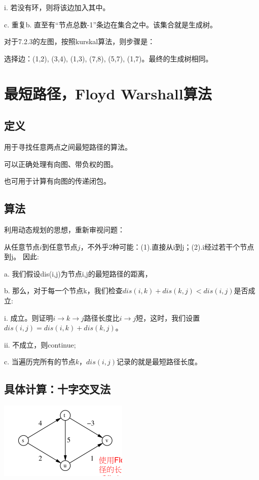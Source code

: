 \documentclass[a4paper]{article}    %
\begin{document}
\indent\indent i. 若没有环，则将该边加入其中。

c. 重复b. 直至有“节点总数-1”条边在集合之中。该集合就是生成树。

对于7.2.3的左图，按照kurskal算法，则步骤是：

选择边：(1,2), (3,4), (1,3), (7,8), (5,7), (1,7)。最终的生成树相同。

\section{最短路径，Floyd Warshall算法}

\subsection{定义}

用于寻找任意两点之间最短路径的算法。

可以正确处理有向图、带负权的图。

也可用于计算有向图的传递闭包。

\subsection{算法}

利用动态规划的思想，重新审视问题：

从任意节点$i$到任意节点$j$，不外乎2种可能：(1).直接从i到j；(2).i经过若干个节点到j。
因此:

a. 我们假设dis(i,j)为节点i,j的最短路径的距离，

b. 那么，对于每一个节点k，我们检查$dis(i,k)+dis(k,j) < dis(i,j)$是否成立:

\indent\indent i. 成立。则证明$i\rightarrow k \rightarrow j$路径长度比$i\rightarrow j$短，这时，我们设置$dis(i,j) = dis(i,k) + dis(k,j)$。

\indent\indent ii. 不成立，则continue;

c. 当遍历完所有的节点$k$，$dis(i,j)$记录的就是最短路径长度。

\subsection{具体计算：十字交叉法}

\begin{center}
    \includegraphics[scale=0.6]{25.png}
\end{center}
\end{document}
